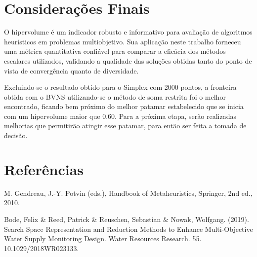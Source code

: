 \documentclass[
	12pt,				%
	oneside,			%
	a4paper,			%
	chapter=TITLE,
	sumario=tradicional,
	english,			%
	brazil				%
]{abntex2}
\begin{document}
\chapter{Considerações Finais}

O hipervolume é um indicador robusto e informativo para avaliação de algoritmos heurísticos em problemas multiobjetivo. Sua aplicação neste trabalho
forneceu uma métrica quantitativa confiável para comparar a eficácia dos métodos escalares utilizados, validando a qualidade das soluções obtidas tanto do ponto de
vista de convergência quanto de diversidade.

Excluindo-se o resultado obtido para o Simplex com 2000 pontos, a fronteira obtida com o BVNS utilizando-se o método de soma restrita foi o melhor encontrado, ficando bem
próximo do melhor patamar estabelecido que se inicia com um hipervolume maior que $0.60$. Para a próxima etapa, serão realizadas melhorias que permitirão atingir esse patamar,
para então ser feita a tomada de decisão.


\chapter{Referências}\label{cap:referencias} 

\noindent M. Gendreau, J.-Y. Potvin (eds.), Handbook of Metaheuristics, Springer, 2nd ed., 2010.

\noindent Bode, Felix \& Reed, Patrick \& Reuschen, Sebastian \& Nowak, Wolfgang. (2019). Search Space Representation and Reduction Methods to Enhance Multi-Objective Water Supply Monitoring Design. Water Resources Research. 55. 10.1029/2018WR023133. 
\end{document}
